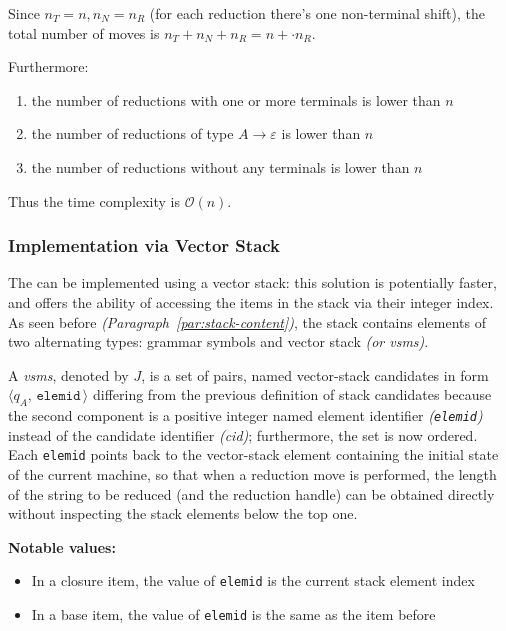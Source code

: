 \documentclass[english]{article}
\begin{document}
Since \(n_T = n, n_N=n_R\) (for each reduction there's one non-terminal shift), the total number of moves is \(n_T + n_N + n_R = n +  \cdot n_R\).

Furthermore:
\begin{enumerate}
  \item the number of reductions with one or more terminals is lower than \(n\)
  \item the number of reductions of type \(A \rightarrow \varepsilon\) is lower than \(n\)
  \item the number of reductions without any terminals is lower than \(n\)
\end{enumerate}

Thus the time complexity is \(\mathcal{O}(n)\).

\subsubsection{Implementation via Vector Stack}

The \PDA can be implemented using a vector stack: this solution is potentially faster, and offers the ability of accessing the items in the stack via their integer index.
As seen before \textit{(Paragraph~\ref{par:stack-content})}, the stack contains elements of two alternating types: grammar symbols and vector stack \mstates \textit{(or vsms)}.

A \textit{vsms}, denoted by \(J\), is a set of pairs, named vector-stack candidates in form \(\langle q_A, \, \texttt{elemid} \, \rangle\) differing from the previous definition of stack candidates because the second component is a positive integer named element identifier \textit{(\texttt{elemid})} instead of the candidate identifier \textit{(cid)};
furthermore, the set is now ordered.
Each \texttt{elemid} points back to the vector-stack element containing the initial state of the current machine, so that when a reduction move is performed, the length of the string to be reduced (and the reduction handle) can be obtained directly without inspecting the stack elements below the top one.

\bigskip
\textbf{Notable values:}

\begin{itemize}
  \item In a closure item, the value of \texttt{elemid} is the current stack element index
  \item In a base item, the value of \texttt{elemid} is the same as the item before
\end{itemize}
\end{document}
